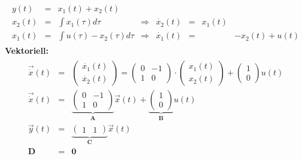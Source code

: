 \message{ !name(Mitschrieb_SysRegel.tex)}\documentclass[12pt,a4paper,ngerman]{scrartcl}
\begin{document}
\begin{align*}
  \begin{array}{llllllll}
    y(t)&=&x_1(t)+x_2(t)\\
    x_2(t)&=&\int{x_1(\tau)d\tau}&\Rightarrow&\dot{x_2}(t)&=&x_1(t)\\
    x_1(t)&=&\int{u(\tau)-x_2(\tau)d\tau}&\Rightarrow&\dot{x_1}(t)&=&&-x_2(t)+u(t)
  \end{array}
\end{align*}
\textbf{Vektoriell:}
\begin{align*}
  \begin{array}{lllll}
    \vec{\dot{x}}(t)&=&
    \begin{pmatrix}
      \dot{x_1}(t)\\
      \dot{x_2}(t)
    \end{pmatrix}
=
\begin{pmatrix}
  0&-1\\
  1&0
\end{pmatrix}
\cdot
\begin{pmatrix}
  x_1(t)\\
  x_2(t)
\end{pmatrix}
+
\begin{pmatrix}
  1\\0
\end{pmatrix}
u(t)\\[1cm]
\vec{\dot{x}}(t)&=&
\underbrace{
\begin{pmatrix}
  0&-1\\
  1&0
\end{pmatrix}}_{\mathbf{A}}
\vec{x}(t)+
\underbrace{
\begin{pmatrix}
1\\0  
\end{pmatrix}}_{\mathbf{B}}u(t)\\[1cm]
\vec{y}(t)&=& \underbrace{
  \begin{pmatrix}
    1&1
  \end{pmatrix}}_{\mathbf{C}}\vec{x}(t)\\
\mathbf{D}&=& \mathbf{0}
  \end{array}
\end{align*}
\end{document}
